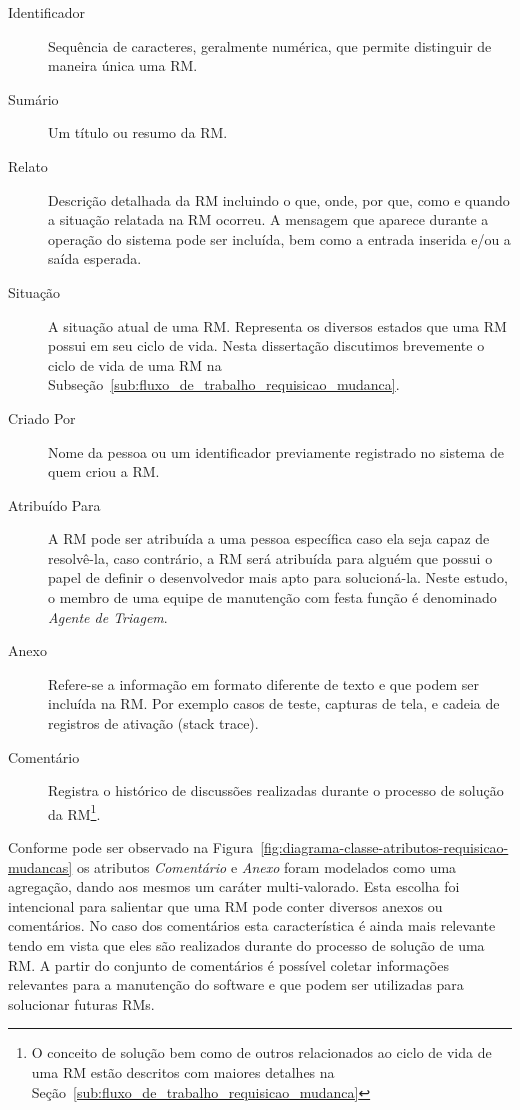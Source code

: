 \begin{description}
    \item [Identificador] Sequência de caracteres, geralmente numérica,  que
        permite distinguir de maneira única uma RM\@.
	\item [Sumário] Um título ou resumo da RM\@.
	\item [Relato] Descrição detalhada da RM incluindo o que, onde, por que,
		como e quando a situação relatada na RM ocorreu. A mensagem que aparece
		durante a operação do sistema pode ser incluída, bem como a entrada
		inserida e/ou a saída esperada.
	\item [Situação] A situação atual de uma RM\@. Representa os diversos
		estados que uma RM possui em seu ciclo de vida. Nesta dissertação
		discutimos brevemente o ciclo de vida de uma RM na
		Subseção~\ref{sub:fluxo_de_trabalho_requisicao_mudanca}.
    \item [Criado Por] Nome da pessoa ou um identificador previamente registrado
        no sistema de quem criou a RM\@.
    \item [Atribuído Para] A RM pode ser atribuída a uma pessoa específica caso
        ela seja capaz de resolvê-la, caso contrário, a RM será atribuída para
        alguém que possui o papel de definir o desenvolvedor mais apto para
        solucioná-la. Neste estudo, o membro de uma equipe de manutenção com
        festa função é denominado \textit{Agente de Triagem}.
    \item [Anexo] Refere-se a informação em formato diferente de texto e que
        podem ser incluída na RM\@. Por exemplo casos de teste, capturas de tela,
        e cadeia de registros de ativação (stack trace).
    \item [Comentário] Registra o histórico de discussões realizadas durante o
        processo de solução da RM\@\footnote{O conceito de solução bem como de
            outros relacionados ao ciclo de vida de uma RM estão descritos com
        maiores detalhes na Seção~\ref{sub:fluxo_de_trabalho_requisicao_mudanca}}.
\end{description}

Conforme pode ser observado na
Figura~\ref{fig:diagrama-classe-atributos-requisicao-mudancas} os atributos
\textit{Comentário} e \textit{Anexo} foram modelados como uma agregação, dando
aos mesmos um caráter multi-valorado. Esta escolha foi intencional para
salientar que uma RM pode conter diversos anexos ou comentários. No caso dos
comentários esta característica é ainda mais relevante tendo em vista que eles
são realizados durante do processo de solução de uma RM\@. A partir do conjunto de
comentários é possível coletar informações relevantes para a manutenção do
software e que podem ser utilizadas para solucionar futuras RMs.

